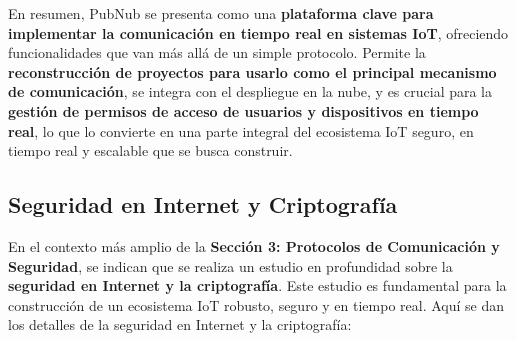 \documentclass{report}
\begin{document}
En resumen, PubNub se presenta como una \textbf{plataforma clave para implementar la comunicación en tiempo real en sistemas IoT}, 
ofreciendo funcionalidades que van más allá de un simple protocolo. Permite la \textbf{reconstrucción de proyectos para usarlo como el principal 
mecanismo de comunicación}, se integra con el despliegue en la nube, y es crucial para la \textbf{gestión de permisos de acceso de usuarios y 
dispositivos en tiempo real}, lo que lo convierte en una parte integral del ecosistema IoT seguro, en tiempo real y escalable que se busca construir.

\subsection{Seguridad en Internet y Criptografía}
En el contexto más amplio de la \textbf{Sección 3: Protocolos de Comunicación y Seguridad}, se  indican que se realiza un estudio en profundidad 
sobre la \textbf{seguridad en Internet y la criptografía}. Este estudio es fundamental para la construcción de un ecosistema IoT robusto, seguro y en 
tiempo real. Aquí se dan los detalles de la seguridad en Internet y la criptografía:
\end{document}
